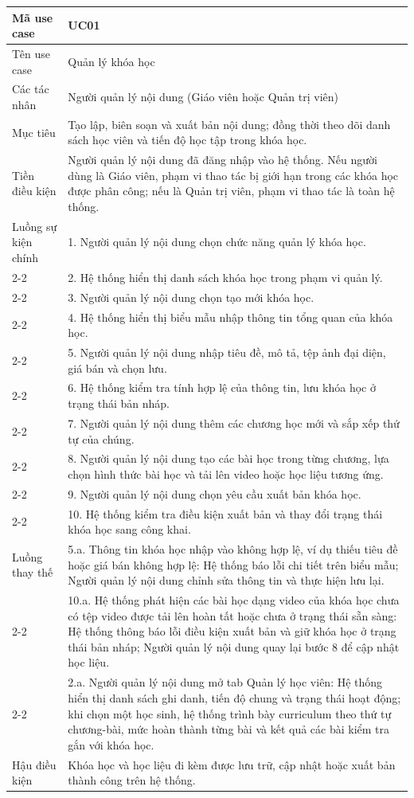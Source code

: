 ﻿\documentclass[../DoAn.tex]{subfiles}
\begin{document}
\begin{longtable}{|p{3.5cm}|p{10.5cm}|}
Mã use case & UC01 \\ \hline
Tên use case & Quản lý khóa học \\ \hline
Các tác nhân & Người quản lý nội dung (Giáo viên hoặc Quản trị viên) \\ \hline
Mục tiêu & Tạo lập, biên soạn và xuất bản nội dung; đồng thời theo dõi danh sách học viên và tiến độ học tập trong khóa học. \\ \hline
Tiền điều kiện & Người quản lý nội dung đã đăng nhập vào hệ thống. Nếu người dùng là Giáo viên, phạm vi thao tác bị giới hạn trong các khóa học được phân công; nếu là Quản trị viên, phạm vi thao tác là toàn hệ thống. \\ \hline
Luồng sự kiện chính & 1. Người quản lý nội dung chọn chức năng quản lý khóa học. \\ \cline{2-2}
& 2. Hệ thống hiển thị danh sách khóa học trong phạm vi quản lý. \\ \cline{2-2}
& 3. Người quản lý nội dung chọn tạo mới khóa học. \\ \cline{2-2}
& 4. Hệ thống hiển thị biểu mẫu nhập thông tin tổng quan của khóa học. \\ \cline{2-2}
& 5. Người quản lý nội dung nhập tiêu đề, mô tả, tệp ảnh đại diện, giá bán và chọn lưu. \\ \cline{2-2}
& 6. Hệ thống kiểm tra tính hợp lệ của thông tin, lưu khóa học ở trạng thái bản nháp. \\ \cline{2-2}
& 7. Người quản lý nội dung thêm các chương học mới và sắp xếp thứ tự của chúng. \\ \cline{2-2}
& 8. Người quản lý nội dung tạo các bài học trong từng chương, lựa chọn hình thức bài học và tải lên video hoặc học liệu tương ứng. \\ \cline{2-2}
& 9. Người quản lý nội dung chọn yêu cầu xuất bản khóa học. \\ \cline{2-2}
& 10. Hệ thống kiểm tra điều kiện xuất bản và thay đổi trạng thái khóa học sang công khai. \\ \hline
Luồng thay thế & 5.a. Thông tin khóa học nhập vào không hợp lệ, ví dụ thiếu tiêu đề hoặc giá bán không hợp lệ: Hệ thống báo lỗi chi tiết trên biểu mẫu; Người quản lý nội dung chỉnh sửa thông tin và thực hiện lưu lại. \\ \cline{2-2}
& 10.a. Hệ thống phát hiện các bài học dạng video của khóa học chưa có tệp video được tải lên hoàn tất hoặc chưa ở trạng thái sẵn sàng: Hệ thống thông báo lỗi điều kiện xuất bản và giữ khóa học ở trạng thái bản nháp; Người quản lý nội dung quay lại bước 8 để cập nhật học liệu. \\ \cline{2-2}
& 2.a. Người quản lý nội dung mở tab Quản lý học viên: Hệ thống hiển thị danh sách ghi danh, tiến độ chung và trạng thái hoạt động; khi chọn một học sinh, hệ thống trình bày curriculum theo thứ tự chương-bài, mức hoàn thành từng bài và kết quả các bài kiểm tra gắn với khóa học. \\ \hline
Hậu điều kiện & Khóa học và học liệu đi kèm được lưu trữ, cập nhật hoặc xuất bản thành công trên hệ thống. \\ \hline
\end{longtable}
\endgroup
\end{document}
